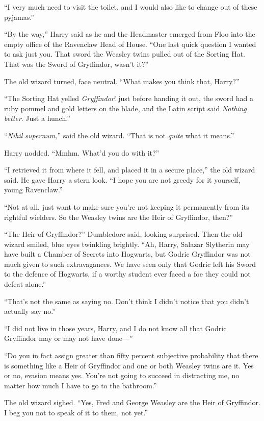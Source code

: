 “I very much need to visit the toilet, and I would also like to change out of these pyjamas.”

\later

“By the way,” Harry said as he and the Headmaster emerged from Floo into the empty office of the Ravenclaw Head of House. “One last quick question I wanted to ask just you. That sword the Weasley twins pulled out of the Sorting Hat. That was the Sword of Gryffindor, wasn’t it?”

The old wizard turned, face neutral. “What makes you think that, Harry?”

“The Sorting Hat yelled \emph{Gryffindor}! just before handing it out, the sword had a ruby pommel and gold letters on the blade, and the Latin script said \emph{Nothing better}. Just a hunch.”

“\emph{Nihil supernum,}” said the old wizard. “That is not \emph{quite} what it means.”

Harry nodded. “Mmhm. What’d you do with it?”

“I retrieved it from where it fell, and placed it in a secure place,” the old wizard said. He gave Harry a stern look. “I hope you are not greedy for it yourself, young Ravenclaw.”

“Not at all, just want to make sure you’re not keeping it permanently from its rightful wielders. So the Weasley twins are the Heir of Gryffindor, then?”

“The Heir of Gryffindor?” Dumbledore said, looking surprised. Then the old wizard smiled, blue eyes twinkling brightly. “Ah, Harry, Salazar Slytherin may have built a Chamber of Secrets into Hogwarts, but Godric Gryffindor was not much given to such extravagances. We have seen only that Godric left his Sword to the defence of Hogwarts, if a worthy student ever faced a foe they could not defeat alone.”

“That’s not the same as saying no. Don’t think I didn’t notice that you didn’t actually say no.”

“I did not live in those years, Harry, and I do not know all that Godric Gryffindor may or may not have done—”

“Do you in fact assign greater than fifty percent subjective probability that there is something like a Heir of Gryffindor and one or both Weasley twins are it. Yes or no, evasion means yes. You’re not going to succeed in distracting me, no matter how much I have to go to the bathroom.”

The old wizard sighed. “Yes, Fred and George Weasley are the Heir of Gryffindor. I beg you not to speak of it to them, not yet.”

